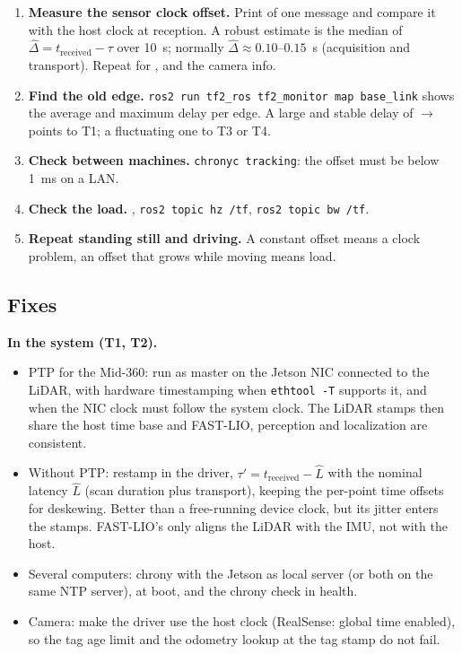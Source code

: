\begin{enumerate}
  \item \textbf{Measure the sensor clock offset.} Print  of one
     message and compare it with the host clock at reception. A robust
    estimate is the median of $\hat\Delta = t_{\mathrm{received}} - \tau$ over 10~s; normally
    $\hat\Delta \approx 0.10$--$0.15$~s (acquisition and transport). Repeat for
    ,  and the camera info.
  \item \textbf{Find the old edge.} \texttt{ros2 run tf2\_ros tf2\_monitor map base\_link} shows the
    average and maximum delay per edge. A large and stable delay of
    $\to$ points to T1; a fluctuating one to T3 or T4.
  \item \textbf{Check between machines.} \texttt{chronyc tracking}: the offset must be below 1~ms on
    a LAN.
  \item \textbf{Check the load.} , \texttt{ros2 topic hz /tf},
    \texttt{ros2 topic bw /tf}.
  \item \textbf{Repeat standing still and driving.} A constant offset means a clock problem, an
    offset that grows while moving means load.
\end{enumerate}

\subsection{Fixes}

\textbf{In the system (T1, T2).}
\begin{itemize}
  \item PTP for the Mid-360: run  as master on the Jetson NIC connected to the LiDAR,
    with hardware timestamping when \texttt{ethtool -T} supports it, and  when the NIC
    clock must follow the system clock. The LiDAR stamps then share the host time base and
    FAST-LIO, perception and localization are consistent.
  \item Without PTP: restamp in the driver, $\tau' = t_{\mathrm{received}} - \hat L$ with the nominal
    latency $\hat L$ (scan duration plus transport), keeping the per-point time offsets for
    deskewing. Better than a free-running device clock, but its jitter enters the stamps.
    FAST-LIO's  only aligns the LiDAR with the IMU, not with the host.
  \item Several computers: chrony with the Jetson as local server (or both on the same NTP server),
     at boot, and the chrony check in health.
  \item Camera: make the driver use the host clock (RealSense: global time enabled), so the tag age
    limit and the odometry lookup at the tag stamp do not fail.
\end{itemize}

